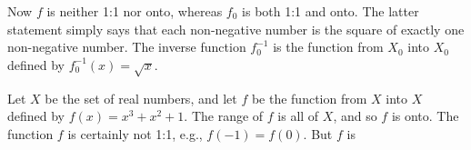 Now \(f\) is neither 1:1 nor onto, whereas \(f_{0}\) is both 1:1 and onto. The latter statement simply says that each non-negative number is the square of exactly one non-negative number. The inverse function \(f_{0}^{-1}\) is the function from \(X_{0}\) into \(X_{0}\) defined by \(f_{0}^{-1}(x)=\sqrt{x}\).

Let \(X\) be the set of real numbers, and let \(f\) be the function from \(X\) into \(X\) defined by \(f(x)=x^{3}+x^{2}+1\). The range of \(f\) is all of \(X\), and so \(f\) is onto. The function \(f\) is certainly not 1:1, e.g., \(f(-1)=f(0)\). But \(f\) is 